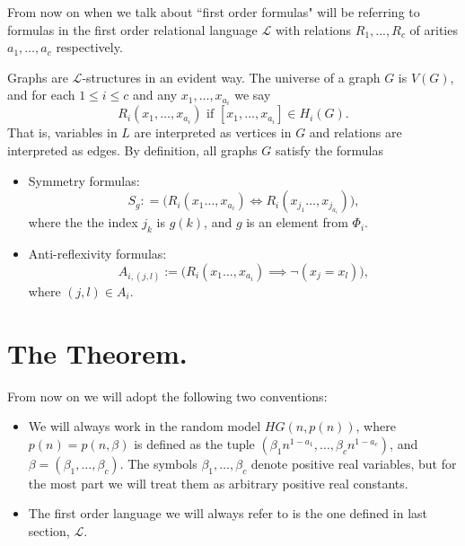\documentclass[11pt,notitlepage]{report}
\theoremstyle{definition}
\begin{document}
From now on when we talk about ``first order formulas" 
will be referring to formulas in the first order relational 
language $\mathcal{L}$ with relations $R_1,..., R_c$ of arities
$a_1,\dots, a_c$ respectively. \par

Graphs are $\mathcal{L}$-structures in an evident way. 
The universe of a graph $G$ is $V(G)$, and for each 
$1\leq i \leq c$ and any $x_1,\dots, x_{a_i}$ we say 
\[R_i(x_1,\dots,x_{a_i}) \text{ if } [x_1,\dots, x_{a_i}]\in H_i(G).\] 
That is, variables in $L$ are interpreted as vertices in $G$ and
relations are interpreted as edges. By definition, all graphs $G$ 
satisfy the formulas
\begin{itemize}
	\item Symmetry formulas:
	\[ S_g: =\big( R_i(x_1\dots,x_{a_i})\iff R_i(x_{j_1}\dots,x_{j_{a_i}})\big) ,\]
	where the the index $j_k$ is $g(k)$, and $g$ is an element from $\Phi_i$.
	\item Anti-reflexivity formulas:
	\[A_{i,(j,l)}:=\big(R_i(x_1\dots,x_{a_i})\implies 
	\neg(x_j= x_l)\big),\]
	where $(j,l)\in A_i$.
\end{itemize}
 
\section{The Theorem.}

From now on we will adopt the following two conventions:
\begin{itemize}
	\item We will always work in the random model $HG(n,p(n))$, where
	$p(n)=p(n,\beta)$ is defined as the tuple
	$(\beta_1 n^{1-a_1},\dots, \beta_c n^{1-a_c})$, and
	$\beta=(\beta_1,\dots, \beta_c)$.
	The symbols $\beta_1,\dots, \beta_c$
	denote positive real variables,
	but for the most part we will 
	treat them as arbitrary positive real constants.
	\item The first order language we will always refer to is the one 
	defined in last section, $\mathcal{L}$. 
\end{itemize}
 
\end{document}
